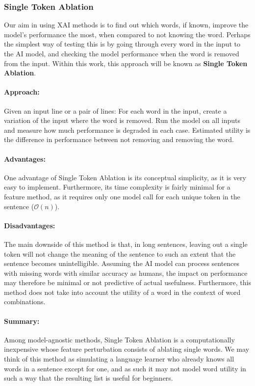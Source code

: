 \subsubsection{Single Token Ablation}
Our aim in using XAI methods is to find out which words, if known, improve the model's performance the most, when compared to not knowing the word.
Perhaps the simplest way of testing this is by going through every word in the input to the AI model, and checking the model performance when the word is removed from the input.
Within this work, this approach will be known as \textbf{Single Token Ablation}.

\paragraph{Approach:}
Given an input line or a pair of lines:
For each word in the input, create a variation of the input where the word is removed.
Run the model on all inputs and measure how much performance is degraded in each case.
Estimated utility is the difference in performance between not removing and removing the word.

\paragraph{Advantages:}
One advantage of Single Token Ablation is its conceptual simplicity, as it is very easy to implement.
Furthermore, its time complexity is fairly minimal for a feature method, as it requires only one model call for each unique token in the sentence ($\mathcal{O}(n)$).

\paragraph{Disadvantages:}
The main downside of this method is that, in long sentences, leaving out a single token will not change the meaning of the sentence to such an extent that the sentence becomes unintelligible.
Assuming the AI model can process sentences with missing words with similar accuracy as humans, the impact on performance may therefore be minimal or not predictive of actual usefulness.
Furthermore, this method does not take into account the utility of a word in the context of word combinations.

\paragraph{Summary:}
Among model-agnostic methods, Single Token Ablation is a computationally inexpensive whose feature perturbation consists of ablating single words.
We may think of this method as simulating a language learner who already knows all words in a sentence except for one, and as such it may not model word utility in such a way that the resulting list is useful for beginners.

